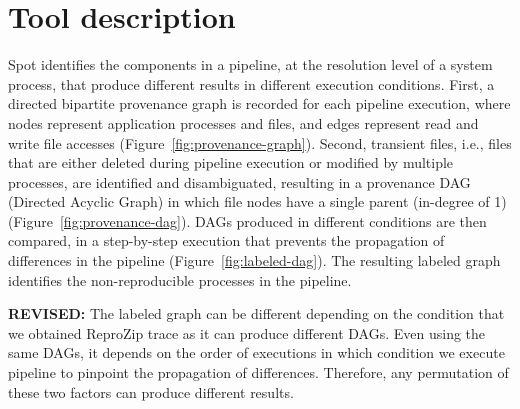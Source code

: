 \documentclass[a4paper,num-refs]{oup-contemporary}
\newcommand{\revised}[1]{\color{blue}\textbf{REVISED:}#1\color{black}}
\newcommand{\reprozip}[0]{ReproZip\xspace}
\newcommand{\toolname}[0]{Spot\xspace}
\begin{document}



\section{Tool description}

\toolname identifies the components in a pipeline, at the resolution level of a system process, that produce different
results in different execution conditions. First, a directed
bipartite provenance graph is recorded for each pipeline execution, where nodes
represent application processes and files, and edges represent read and
write file accesses (Figure~\ref{fig:provenance-graph}). Second,
transient files, i.e., files that are either deleted during pipeline
execution or modified by multiple processes, are identified and
disambiguated, resulting in a provenance DAG (Directed Acyclic
Graph) in which file nodes have a single parent (in-degree of 1) (Figure~\ref{fig:provenance-dag}). 
DAGs produced in different conditions are then compared, in
a step-by-step execution that prevents the propagation of differences in the pipeline (Figure~\ref{fig:labeled-dag}).
 The resulting labeled graph identifies the
non-reproducible processes in the pipeline. 

\revised{
The labeled graph can be different depending on the condition that we obtained \reprozip trace as it can produce 
different DAGs. Even using the same DAGs, it depends on the order of executions in which condition 
we execute pipeline to pinpoint the propagation of differences. 
Therefore, any permutation of these two factors can produce different results.

}
\end{document}
